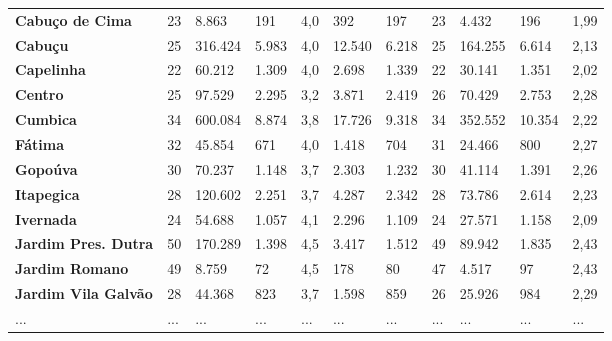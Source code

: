 \begin{spacing}{1}
\begin{landscape}
\begin{table}[H]
\begin{tabular}{|p{4cm}|p{1.5cm}p{2cm}p{2cm}p{1.5cm}p{1cm}p{1cm}p{1.5cm}p{2.5cm}p{1.5cm}p{1.5cm}|}
    \textbf{Cabuço de Cima}          & 23 & 8.863   & 191   & 4,0 & 392    & 197   & 23 & 4.432   & 196    & 1,99 \\
    \textbf{Cabuçu}                  & 25 & 316.424 & 5.983 & 4,0 & 12.540 & 6.218 & 25 & 164.255 & 6.614  & 2,13 \\
    \textbf{Capelinha}               & 22 & 60.212  & 1.309 & 4,0 & 2.698  & 1.339 & 22 & 30.141  & 1.351  & 2,02 \\
    \textbf{Centro}                  & 25 & 97.529  & 2.295 & 3,2 & 3.871  & 2.419 & 26 & 70.429  & 2.753  & 2,28 \\
    \textbf{Cumbica}                 & 34 & 600.084 & 8.874 & 3,8 & 17.726 & 9.318 & 34 & 352.552 & 10.354 & 2,22 \\
    \textbf{Fátima}                  & 32 & 45.854  & 671   & 4,0 & 1.418  & 704   & 31 & 24.466  & 800    & 2,27 \\
    \textbf{Gopoúva}                 & 30 & 70.237  & 1.148 & 3,7 & 2.303  & 1.232 & 30 & 41.114  & 1.391  & 2,26 \\
    \textbf{Itapegica}               & 28 & 120.602 & 2.251 & 3,7 & 4.287  & 2.342 & 28 & 73.786  & 2.614  & 2,23 \\
    \textbf{Ivernada}                & 24 & 54.688  & 1.057 & 4,1 & 2.296  & 1.109 & 24 & 27.571  & 1.158  & 2,09 \\
    \textbf{Jardim Pres. Dutra} & 50 & 170.289 & 1.398 & 4,5 & 3.417  & 1.512 & 49 & 89.942  & 1.835  & 2,43 \\
    \textbf{Jardim Romano}           & 49 & 8.759   & 72    & 4,5 & 178    & 80    & 47 & 4.517   & 97     & 2,43 \\
    \textbf{Jardim Vila Galvão}      & 28 & 44.368  & 823   & 3,7 & 1.598  & 859   & 26 & 25.926  & 984    & 2,29 \\
    ... & ... & ... & ... & ... & ... & ... & ... & ... & ... & ... \\ \hline
    \end{tabular}
    \label{tab:resultados_completos}
\end{table}



\end{landscape}
\end{spacing}
